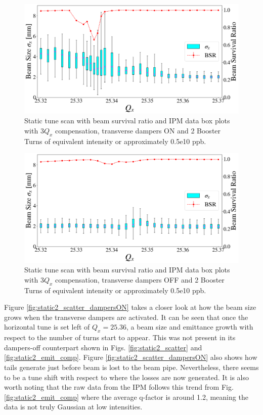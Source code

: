 \newpage
\begin{figure}[H]
    \centering
    \includegraphics[width=\columnwidth]{chapter6/static2turns_ipm_dampersON.png}
    \caption{Static tune scan with beam survival ratio and IPM data box plots with $3Q_x$ compensation, transverse dampers ON and 2 Booster Turns of equivalent intensity or approximately 0.5e10 ppb.}
    \label{fig:static2_dampersON}
\end{figure}

\begin{figure}[H]
    \centering
    \includegraphics[width=\columnwidth]{chapter6/static2turns_ipm_dampersOFF.png}
    \caption{Static tune scan with beam survival ratio and IPM data box plots with $3Q_x$ compensation, transverse dampers OFF and 2 Booster Turns of equivalent intensity or approximately 0.5e10 ppb.}
    \label{fig:static2_dampersOFF}
\end{figure}
\newpage

Figure \ref{fig:static2_scatter_dampersON} takes a closer look at how the beam size grows when the transverse dampers are activated. It can be seen that once the horizontal tune is set left of $Q_x=25.36$, a beam size and emittance growth with respect to the number of turns start to appear. This was not present in its dampers-off counterpart shown in Figs. \ref{fig:static2_scatter} and \ref{fig:static2_emit_comp}. Figure \ref{fig:static2_scatter_dampersON} also shows how tails generate just before beam is lost to the beam pipe. Nevertheless, there seems to be a tune shift with respect to where the losses are now generated. It is also worth noting that the raw data from the IPM follows this trend from Fig. \ref{fig:static2_emit_comp} where the average q-factor is around 1.2, meaning the data is not truly Gaussian at low intensities.

